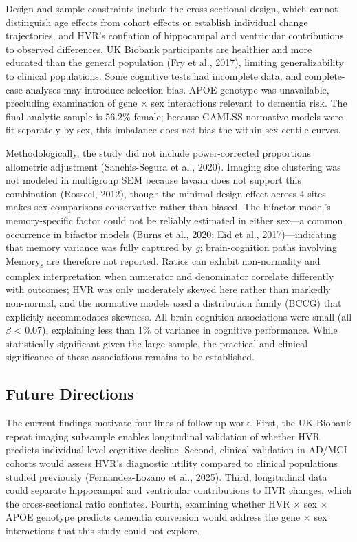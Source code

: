 \documentclass[
]{article}
\begin{document}
Design and sample constraints include the cross-sectional design, which
cannot distinguish age effects from cohort effects or establish
individual change trajectories, and HVR's conflation of hippocampal and
ventricular contributions to observed differences. UK Biobank
participants are healthier and more educated than the general population
(Fry et al., 2017), limiting generalizability to clinical populations.
Some cognitive tests had incomplete data, and complete-case analyses may
introduce selection bias. APOE genotype was unavailable, precluding
examination of gene × sex interactions relevant to dementia risk. The
final analytic sample is 56.2\% female; because GAMLSS normative models
were fit separately by sex, this imbalance does not bias the within-sex
centile curves.

Methodologically, the study did not include power-corrected proportions
allometric adjustment (Sanchis-Segura et al., 2020). Imaging site
clustering was not modeled in multigroup SEM because lavaan does not
support this combination (Rosseel, 2012), though the minimal design
effect across 4 sites makes sex comparisons conservative rather than
biased. The bifactor model's memory-specific factor could not be
reliably estimated in either sex---a common occurrence in bifactor
models (Burns et al., 2020; Eid et al., 2017)---indicating that memory
variance was fully captured by \emph{g}; brain-cognition paths involving
Memory\textsubscript{s} are therefore not reported. Ratios can exhibit
non-normality and complex interpretation when numerator and denominator
correlate differently with outcomes; HVR was only moderately skewed here
rather than markedly non-normal, and the normative models used a
distribution family (BCCG) that explicitly accommodates skewness. All
brain-cognition associations were small (all \(\beta\) \textless{}
0.07), explaining less than 1\% of variance in cognitive performance.
While statistically significant given the large sample, the practical
and clinical significance of these associations remains to be
established.

\subsection{Future Directions}\label{future-directions}

The current findings motivate four lines of follow-up work. First, the
UK Biobank repeat imaging subsample enables longitudinal validation of
whether HVR predicts individual-level cognitive decline. Second,
clinical validation in AD/MCI cohorts would assess HVR's diagnostic
utility compared to clinical populations studied previously
(Fernandez-Lozano et al., 2025). Third, longitudinal data could separate
hippocampal and ventricular contributions to HVR changes, which the
cross-sectional ratio conflates. Fourth, examining whether HVR × sex ×
APOE genotype predicts dementia conversion would address the gene × sex
interactions that this study could not explore.
\end{document}
